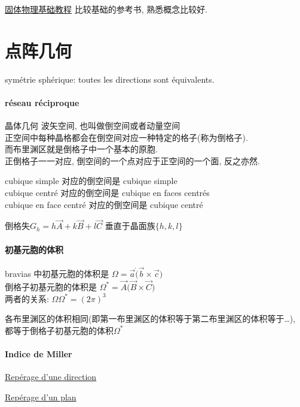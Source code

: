 \documentclass[openany]{article}
\begin{document}
\href{http://book.douban.com/subject/20493641/}{固体物理基础教程}
比较基础的参考书, 熟悉概念比较好.

\section{点阵几何}
sym\'etrie sph\'erique: toutes les directions sont \'equivalents.

\paragraph{r\'eseau r\'eciproque}
晶体几何 波矢空间, 也叫做倒空间或者动量空间\\
正空间中每种晶格都会在倒空间对应一种特定的格子(称为倒格子).\\
而布里渊区就是倒格子中一个基本的原胞.\\
正倒格子一一对应,
倒空间的一个点对应于正空间的一个面, 反之亦然.

cubique simple 对应的倒空间是 cubique simple\\
cubique centr\'e 对应的倒空间是 cubique en faces centr\'es\\
cubique en face centr\'e 对应的倒空间是 cubique centr\'e

倒格失$G_h = h \vec{A} + k \vec{B} + l \vec{C}$ 垂直于晶面族$\{h,k,l\}$

\paragraph{初基元胞的体积}
bravias 中初基元胞的体积是 $\Omega = \vec{a} \dot (\vec{b} \times \vec{c})$\\
倒格子初基元胞的体积是 $\Omega^* = \vec{A} \dot (\vec{B} \times \vec{C})$\\
两者的关系: $\Omega \Omega^* = (2\pi)^3$

各布里渊区的体积相同(即第一布里渊区的体积等于第二布里渊区的体积等于\ldots{}), 都等于倒格子初基元胞的体积$\Omega^*$

\paragraph{Indice de Miller}
\href{http://upload.wikimedia.org/wikipedia/commons/thumb/a/af/Indices_miller_direction_exemples.png/799px-Indices_miller_direction_exemples.png}{Rep\'erage d'une direction}

\href{http://upload.wikimedia.org/wikipedia/commons/e/e8/Indices_miller_plan_definition.png}{Rep\'erage d'un plan}
\end{document}
